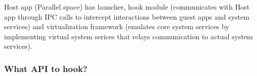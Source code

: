 Host app (Parallel space) has launcher, hook module (communicates with Host app through IPC calls to intercept interactions between guest apps and system services) and virtualization framework (emulates core system services by implementing virtual system serices that relays communication to actual system services).

\subsubsection{What API to hook?}

